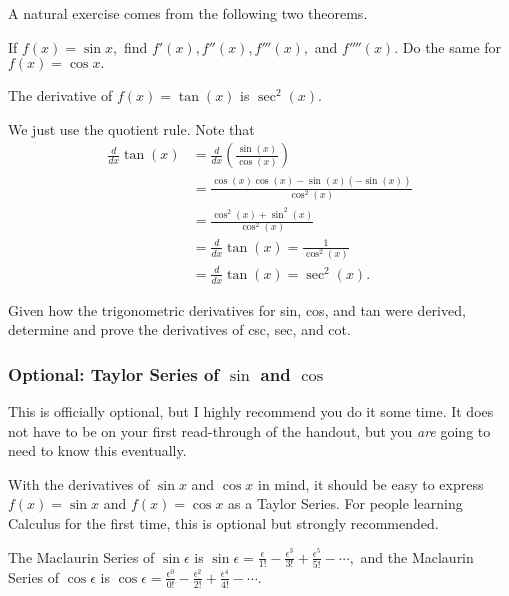 \documentclass[blue,onecol]{shooting}
\begin{document}
A natural exercise comes from the following two theorems.

\begin{exer}
If $f(x)=\sin x,$ find $f'(x),f''(x),f'''(x),$ and $f''''(x).$ Do the same for $f(x)=\cos x.$
\end{exer}

\begin{theo}
The derivative of $f(x) = \tan(x)$ is $\sec^2(x).$
\end{theo}

\begin{pro}
We just use the quotient rule. Note that
\begin{align*}
\frac{d}{dx}\tan(x) &= \frac{d}{dx}\left(\frac{\sin(x)}{\cos(x)}\right)\\
&= \frac{\cos(x)\cos(x) - \sin(x)(-\sin(x))}{\cos^2(x)} \\
&= \frac{\cos^2(x)+\sin^2(x)}{\cos^2(x)} \\
&= \frac{d}{dx}\tan(x) = \frac{1}{\cos^2(x)} \\
&= \frac{d}{dx}\tan(x) = \sec^2(x).
\end{align*}
\end{pro}

\begin{exer}
Given how the trigonometric derivatives for sin, cos, and tan were derived, determine and prove the derivatives of csc, sec, and cot.
\end{exer}

\subsubsection{Optional: Taylor Series of $\sin$ and $\cos$}

This is officially optional, but I highly recommend you do it some time. It does not have to be on your first read-through of the handout, but you \textit{are} going to need to know this eventually.

With the derivatives of $\sin x$ and $\cos x$ in mind, it should be easy to express $f(x)=\sin x$ and $f(x)=\cos x$ as a Taylor Series. For people learning Calculus for the first time, this is optional but strongly recommended.

\begin{theo}
The Maclaurin Series of $\sin \epsilon$ is $\sin\epsilon = \frac{\epsilon}{1!}-\frac{\epsilon^3}{3!}+\frac{\epsilon^5}{5!}-\cdots,$ and the Maclaurin Series of $\cos \epsilon$ is $\cos \epsilon = \frac{\epsilon^0}{0!}-\frac{\epsilon^2}{2!}+\frac{\epsilon^4}{4!}-\cdots.$
\end{theo}
\end{document}
